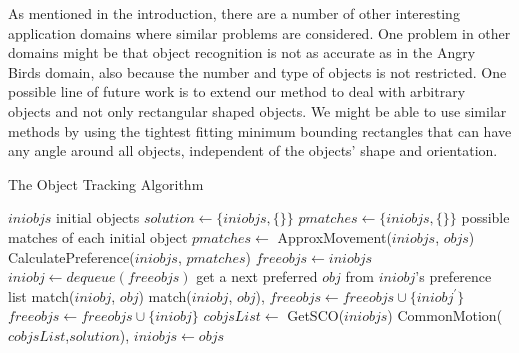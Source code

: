 \documentclass[letterpaper]{article}
\begin{document}
As mentioned in the introduction, there are a number of other interesting application domains where similar problems are considered. One problem in other domains might be that object recognition is not as accurate as in the Angry Birds domain, also because the number and type of objects is not restricted. 
One possible line of future work is to extend our method to deal with arbitrary objects and not only rectangular shaped objects. We might be able to use similar methods by using the tightest fitting minimum bounding rectangles that can have any angle around all objects, independent of the objects' shape and orientation.   

\begin{algorithm}[!]
\caption{The Object Tracking Algorithm}\label{algo}
\begin{algorithmic}[1]
\State $iniobjs$ \Comment initial objects
\State $solution \leftarrow \{iniobjs, \{\}\}$
\State $pmatches \leftarrow \{iniobjs, \{\}\}$ \Comment possible matches of each initial object
\State $pmatches \leftarrow$ ApproxMovement($iniobjs$, $objs$) \label{SetPossible}
\State CalculatePreference($iniobjs$, $pmatches$)\label{calPref}
\State $freeobjs \leftarrow iniobjs$
\label{stableMarriage}
\State $iniobj \leftarrow dequeue(freeobjs)$
\State get a next preferred $obj$ from $iniobj$'s preference list  
  \State match($iniobj$, $obj$)
  \State match($iniobj$, $obj$), $freeobjs \leftarrow freeobjs \cup \{iniobj^{\prime}\}$
  \Else 
  \State $freeobjs \leftarrow freeobjs \cup \{iniobj\}$
\EndIf 
\EndIf
\EndWhile
\State $cobjsList \leftarrow$ GetSCO($iniobjs$)
\State CommonMotion($cobjsList$,$solution$), $iniobjs \leftarrow objs$
\EndProcedure


\end{algorithmic}
\end{algorithm}
\end{document}
